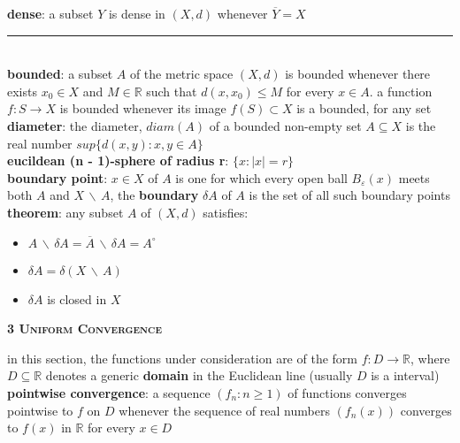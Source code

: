 \documentclass[a4paper]{article}
\newcommand*\closure[1]{\overline{#1}}
\newcommand*\interior[1]{{#1}^\circ}
\newcommand*\abs[1]{\vert #1 \vert}
\newcommand*\setremove[2]{#1 \, \backslash \, #2}
\newcommand*\linesep[0]{\noindent\rule{\textwidth}{0.5pt}\\}
\begin{document}
\begin{multicols}{2}
\begin{framed}
	\noindent
	\textbf{dense}: a subset $Y$ is dense in $(X, d)$ whenever $\closure{Y} = X$
	
	\linesep
	\textbf{bounded}: a subset $A$ of the metric space $(X,d)$ is bounded whenever there exists $x_0 \in X$ and $M \in \mathbb{R}$ such that $d(x, x_0) \leq M$ for every $x \in A$. a function $f: S \rightarrow X$ is bounded whenever its image $f(S) \subset X$ is a bounded, for any set\\
	
	\noindent
	\textbf{diameter}: the diameter, $diam(A)$ of a bounded non-empty set $A \subseteq X$ is the real number $sup\{d(x, y) : x, y \in A\}$\\
	
	\noindent
	\textbf{eucildean (n - 1)-sphere of radius r}: $\{x : \abs{x} = r\}$\\
	
	\noindent
	\textbf{boundary point}: $x \in X$ of $A$ is one for which every open ball $B_\varepsilon(x)$ meets both $A$ and $\setremove{X}{A}$, the \textbf{boundary} $\delta A$ of $A$ is the set of all such boundary points\\
	
	\noindent
	\textbf{theorem}: any subset $A$ of $(X, d)$ satisfies:
		\begin{itemize}
			\item $\setremove{A}{\delta A} = \setremove{\closure{A}}{\delta A} = \interior{A}$
			\item $\delta A = \delta(\setremove{X}{A})$
			\item $\delta A$ is closed in $X$
		\end{itemize}	
\end{framed}

\newpage
\begin{framed}
	\begin{center}
		\textbf{\textsc{3 Uniform Convergence}}
	\end{center}
	in this section, the functions under consideration are of the form $f: D \rightarrow \mathbb{R}$, where $D \subseteq \mathbb{R}$ denotes a generic \textbf{domain} in the Euclidean line (usually $D$ is a interval)\\
	
	\noindent
	\textbf{pointwise convergence}: a sequence $(f_n : n \geq 1)$ of functions converges pointwise to $f$ on $D$ whenever the sequence of real numbers $(f_n(x))$ converges to $f(x)$ in $\mathbb{R}$ for every $x \in D$\\
	

\end{framed}
\end{multicols}
\end{document}
